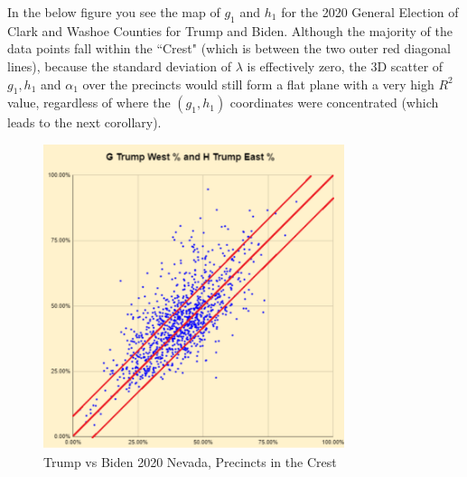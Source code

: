\documentclass[preprint,13pt]{elsarticle}
\begin{document}
In the below figure you see the map of $g_{1}$ and $h_{1}$ for the 2020 General Election of Clark and Washoe Counties for Trump and Biden. Although the majority of the data points fall within the ``Crest" (which is between the two outer red diagonal lines), because the standard deviation of $\lambda$ is effectively zero, the 3D scatter of $g_{1},h_{1}$ and $\alpha_{1}$ over the precincts would still form a flat plane with a very high $R^2$ value, regardless of where the $(g_{1},h_{1})$ coordinates were concentrated (which leads to the next corollary).
\begin{figure}[bp!]
\begin{center}
\caption{Trump vs Biden 2020 Nevada, Precincts in the Crest}
\includegraphics[width=250pt]{Twixt Lemma.png}
\end{center}
\end{figure}
\newpage
\end{document}
